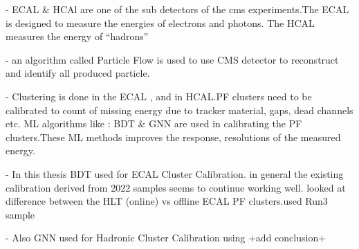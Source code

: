 
- ECAL & HCAl are one of the sub detectors of the cms experiments.The ECAL is designed to measure the energies of electrons and photons. The HCAL measures the energy of “hadrons”
    
- an algorithm called Particle Flow is used to use CMS detector to reconstruct and identify all produced particle.

- Clustering is done in the ECAL , and in HCAL.PF clusters need to be calibrated to count of missing energy due to tracker material, gaps, dead channels etc. ML algorithms like : BDT & GNN are used in calibrating the PF clusters.These ML methods improves the response, resolutions of the measured energy.
    
- In this thesis BDT used for ECAL Cluster Calibration. in general the existing calibration derived from 2022 samples seems to continue working well. looked at difference between the HLT (online) vs offline ECAL PF clusters.used Run3 sample
    
- Also GNN used for Hadronic Cluster Calibration using +add conclusion+

